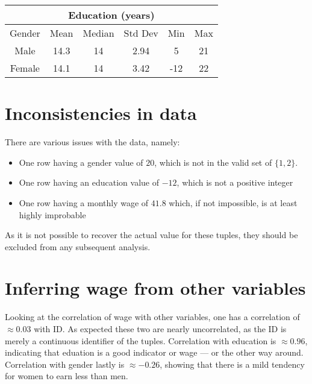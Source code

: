\documentclass[a4paper]{scrreprt}
\begin{document}
\begin{tabular}{c c c c c c }
		\multicolumn{6}{c}{\textbf{Education} (years)} \\
		\toprule
		Gender & Mean & Median & Std Dev & Min & Max \\
		\midrule
		Male   & 14.3 & 14 & 2.94 &   5 & 21 \\
		Female & 14.1 & 14 & 3.42 & -12 & 22 \\
		\bottomrule
\end{tabular}

\section{Inconsistencies in data}

There are various issues with the data, namely:
\begin{itemize}
		\item One row having a gender value of $20$, which is not in the valid
				set of $\{1, 2\}$.
		\item One row having an education value of $-12$, which is not a
				positive integer
		\item One row having a monthly wage of $41.8$ which, if not impossible,
				is at least highly improbable
\end{itemize}

As it is not possible to recover the actual value for these tuples, they should
be excluded from any subsequent analysis.

\section{Inferring wage from other variables}

Looking at the correlation of wage with other variables, one has a correlation
of $\approx 0.03$ with ID. As expected these two are nearly uncorrelated, as
the ID is merely a continuous identifier of the tuples. Correlation with
education is $\approx 0.96$, indicating that eduation is a good indicator or
wage --- or the other way around. Correlation with gender lastly is $\approx
-0.26$, showing that there is a mild tendency for women to earn less than men.
\end{document}
